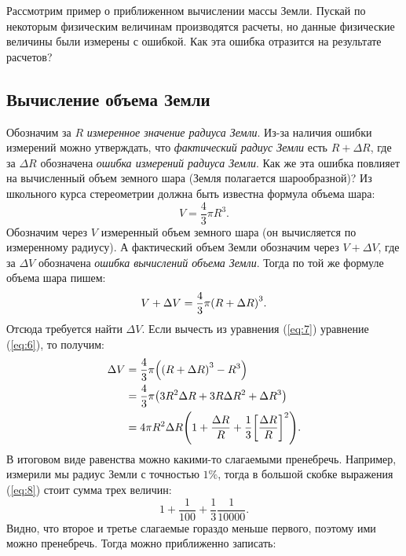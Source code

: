 \documentclass[12pt]{article}
\begin{document}
\par
Рассмотрим пример о приближенном вычислении массы Земли. Пускай по некоторым физическим величинам производятся расчеты, но данные физические величины были измерены с ошибкой. Как эта ошибка отразится на результате расчетов?

\subsection{Вычисление объема Земли}
Обозначим за $R$ \emph{измеренное значение радиуса Земли}. Из\--за наличия ошибки измерений можно утверждать, что \emph{фактический радиус Земли} есть $R+\Delta R$, где за $\Delta R$ обозначена \emph{ошибка измерений радиуса Земли}. Как же эта ошибка повлияет на вычисленный объем земного шара (Земля полагается шарообразной)? Из школьного курса стереометрии должна быть известна формула объема шара:
\begin{equation}\label{eq:6}
 V = \dfrac43 \pi R^3.
\end{equation}
Обозначим через $V$ измеренный объем земного шара (он вычисляется по измеренному радиусу). А фактический объем Земли обозначим через $V + \Delta V$, где  за $\Delta V$ обозначена \emph{ошибка вычислений объема Земли}. Тогда по той же формуле объема шара пишем:
\begin{equation}\label{eq:7}
 V + \Delta V = \dfrac43 \pi \qty(R + \Delta R)^3.
\end{equation}
Отсюда требуется найти $\Delta V$. Если вычесть из уравнения (\ref{eq:7}) уравнение (\ref{eq:6}), то получим:
\begin{equation}
\begin{split}
    \Delta V &= \dfrac43 \pi \qty(\qty(R + \Delta R)^3 - R^3)\\
    &=\dfrac43 \pi \qty(3R^2\Delta R + 3R \Delta R^2 + \Delta R^3)\\
    &= 4 \pi R^2\Delta R \qty( 1 + \dfrac{\Delta R}{R} +\dfrac{1}{3} \qty[\dfrac{\Delta  R}{R}]^2 ).
\end{split}
\label{eq:8}
\end{equation}
В итоговом виде равенства можно какими-то слагаемыми пренебречь. Например, измерили мы радиус Земли с точностью $1\%$, тогда в большой скобке выражения (\ref{eq:8}) стоит сумма трех величин:
\begin{equation}
 1 + \dfrac{1}{100} + \dfrac{1}{3}\dfrac{1}{10000}.
\end{equation}
Видно, что второе и третье слагаемые гораздо меньше первого, поэтому ими можно пренебречь. Тогда можно приближенно записать:
\end{document}
